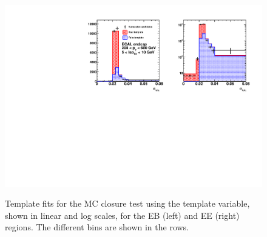\begin{figure}[!htbp]
\begin{multicols}{2}
		\includegraphics[scale=0.41]{figures/closure_test_h_pt200To600_chIso5To10_EE_Fake_sieie.pdf} \\
    \end{multicols}
    \vspace{-0.5cm} %
  	\caption{Template fits for the MC closure test using the \sieie template variable, shown in linear and log scales, for the EB (left) and EE (right) regions. The different \pt bins are shown in the rows.}
  	\label{fig:all_mc_sieie_fits}
\end{figure}

